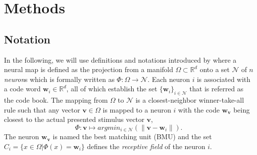 \section{Methods}

\subsection{Notation}

In the following, we will use definitions and notations introduced by \citet{rougier:2011} where a neural map is defined as the projection from a manifold $\Omega \subset \mathbb{R}^d$ onto a set $\mathcal{N}$ of $n$ {\em  neuron}s which is formally written as $\Phi : \Omega \rightarrow \mathcal{N}$. Each neuron $i$ is associated with a code word $\mathbf{w}_i \in \mathbb{R}^d$, all of which establish the set  $\{\mathbf{w}_i\}_{i \in   \mathcal{N}}$ that is referred as the code book. The mapping from $\Omega$ to $\mathcal{N}$ is a closest-neighbor winner-take-all rule such that any vector $\mathbf{v} \in \Omega$ is mapped to a neuron $i$ with the code $\mathbf{w}_\mathbf{v}$ being closest to the actual presented stimulus vector $\mathbf{v}$,
\begin{equation}
\Phi : \mathbf{v} \mapsto argmin_{i \in \mathcal{N}} (\lVert \mathbf{v} -
\mathbf{w}_i \rVert).
\label{eq:psi}
\end{equation}
The neuron $\mathbf{w}_\mathbf{v}$ is named the best matching unit (BMU) and the set $C_i = \{x \in \Omega | \Phi(x) = \mathbf{w}_i \}$ defines the {\em receptive field} of the neuron $i$.




